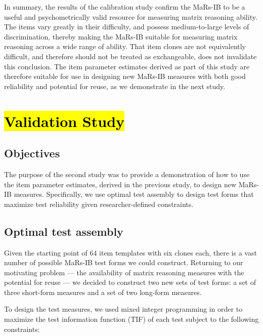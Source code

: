 \documentclass[a4paper,man,natbib,noextraspace]{apa6}
\begin{document}
In summary, the results of the calibration study confirm the MaRs-IB to be a useful and psychometrically valid resource for measuring matrix reasoning ability. The items vary greatly in their difficulty, and possess medium-to-large levels of discrimination, thereby making the MaRs-IB suitable for measuring matrix reasoning across a wide range of ability. That item clones are not equivalently difficult, and therefore should not be treated as exchangeable, does not invalidate this conclusion. The item parameter estimates derived as part of this study are therefore suitable for use in designing new MaRs-IB measures with both good reliability and potential for reuse, as we demonstrate in the next study. 

\section{\texorpdfstring{\hl{Validation Study}}{}}

\subsection{Objectives}

The purpose of the second study was to provide a demonstration of how to use the item parameter estimates, derived in the previous study, to design new MaRs-IB measures. Specifically, we use optimal test assembly \citep{van1998optimal} to design test forms that maximize test reliability given researcher-defined constraints. 

\subsection{Optimal test assembly}

Given the starting point of 64 item templates with six clones each, there is a vast number of possible MaRs-IB test forms we could construct. Returning to our motivating problem --- the availability of matrix reasoning measures with the potential for reuse --- we decided to construct two new sets of test forms: a set of three short-form measures and a set of two long-form measures. 

To design the test measures, we used mixed integer programming \citep{der2005wj} in order to maximize the test information function (TIF) of each test subject to the following constraints:
\end{document}
